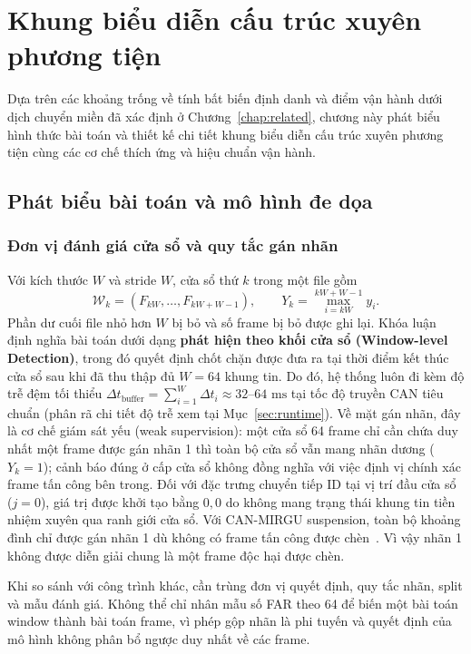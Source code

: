 \documentclass[12pt, a4paper, reqno, oneside]{book}
\begin{document}
\chapter{Khung biểu diễn cấu trúc xuyên phương tiện}\label{chap:method}
Dựa trên các khoảng trống về tính bất biến định danh và điểm vận hành dưới dịch chuyển miền đã xác định ở Chương~\ref{chap:related}, chương này phát biểu hình thức bài toán và thiết kế chi tiết khung biểu diễn cấu trúc xuyên phương tiện cùng các cơ chế thích ứng và hiệu chuẩn vận hành.

\section{Phát biểu bài toán và mô hình đe dọa}
\subsection{Đơn vị đánh giá cửa sổ và quy tắc gán nhãn}
Với kích thước $W$ và stride $W$, cửa sổ thứ $k$ trong một file gồm
\begin{equation}
\mathcal{W}_k=(F_{kW},\ldots,F_{kW+W-1}),\qquad Y_k=\max_{i=kW}^{kW+W-1}y_i.
\end{equation}
Phần dư cuối file nhỏ hơn $W$ bị bỏ và số frame bị bỏ được ghi lại. Khóa luận định nghĩa bài toán dưới dạng \textbf{phát hiện theo khối cửa sổ (Window-level Detection)}, trong đó quyết định chốt chặn được đưa ra tại thời điểm kết thúc cửa sổ sau khi đã thu thập đủ $W=64$ khung tin. Do đó, hệ thống luôn đi kèm độ trễ đệm tối thiểu $\Delta t_{\text{buffer}} = \sum_{i=1}^{W} \Delta t_i \approx 32\text{--}64\text{ ms}$ tại tốc độ truyền CAN tiêu chuẩn (phân rã chi tiết độ trễ xem tại Mục~\ref{sec:runtime}). Về mặt gán nhãn, đây là cơ chế giám sát yếu (weak supervision): một cửa sổ 64 frame chỉ cần chứa duy nhất một frame được gán nhãn 1 thì toàn bộ cửa sổ vẫn mang nhãn dương ($Y_k=1$); cảnh báo đúng ở cấp cửa sổ không đồng nghĩa với việc định vị chính xác frame tấn công bên trong. Đối với đặc trưng chuyển tiếp ID tại vị trí đầu cửa sổ ($j=0$), giá trị được khởi tạo bằng $0{,}0$ do không mang trạng thái khung tin tiền nhiệm xuyên qua ranh giới cửa sổ. Với CAN-MIRGU suspension, toàn bộ khoảng đình chỉ được gán nhãn 1 dù không có frame tấn công được chèn~\cite{rajapaksha2024canmirgu}. Vì vậy nhãn 1 không được diễn giải chung là một frame độc hại được chèn.

Khi so sánh với công trình khác, cần trùng đơn vị quyết định, quy tắc nhãn, split và mẫu đánh giá. Không thể chỉ nhân mẫu số FAR theo 64 để biến một bài toán window thành bài toán frame, vì phép gộp nhãn là phi tuyến và quyết định của mô hình không phân bổ ngược duy nhất về các frame. 
\end{document}
